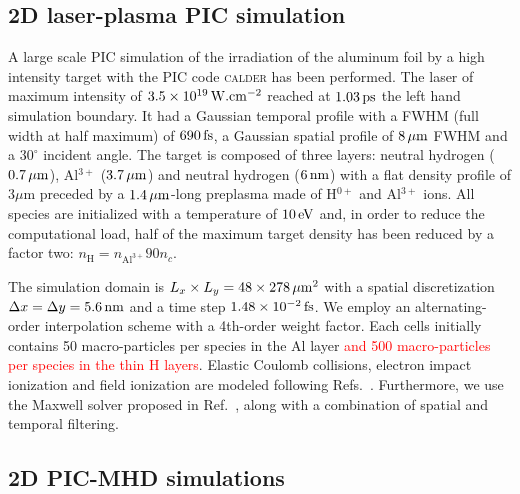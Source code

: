 \documentclass[aps,twocolumn,showpacs,superscriptaddress]{revtex4}
\begin{document}
\subsection*{2D laser-plasma PIC simulation}

A large scale PIC simulation of the irradiation of the aluminum foil by a high intensity target with the PIC code \textsc{calder} has been performed.
The laser of maximum intensity of $3.5 \times 10^{19}\,\rm W.cm^{-2}$ reached at $1.03\,\rm ps$ the left hand simulation boundary. It had a Gaussian temporal profile with a FWHM (full width at half maximum) of $690\,\rm fs$,  a Gaussian spatial profile of $8\,\rm \mu m$ FWHM and a $30^\circ$ incident angle. The target is composed of three layers: neutral hydrogen ($0.7\,\rm \mu m$), Al$^{3+}$ ($3.7\,\rm \mu m$) and neutral hydrogen ($6\,\rm nm$) with a flat density profile of $3 \mu$m preceded by a $1.4\,\rm \mu m$-long preplasma made of H$^{0+}$ and Al$^{3+}$ ions. All species are initialized with a temperature of $10\,\rm eV$ and, in order to reduce the computational load, half of the maximum target density has been reduced by a factor two: $n_\mathrm{H} = n_{\mathrm{Al}^{3+}}90 n_c$.

The simulation domain is $L_x\times L_y = 48 \times 278\,\rm \mu m^2$ with a spatial discretization $\Delta x = \Delta y = 5.6\,\rm nm$ and a time step
$1.48\times 10^{-2}\,\rm fs$. We employ an alternating-order interpolation scheme \cite{CPC_Sokolov_2013} with a 4th-order weight factor. Each cells initially contains
50 macro-particles per species in the Al layer \textcolor{red}{and 500 macro-particles per species in the thin H layers}. Elastic Coulomb collisions, electron impact
ionization and field ionization are modeled following Refs.~\cite{POP_Perez_2012}. Furthermore, we use the Maxwell solver proposed in Ref.~\cite{PRSTAB_Lehe_2013}, along with a combination of spatial \cite{JCP_Vay_2011} and temporal \cite{JCP_Friedman_1990} filtering.

\subsection*{2D PIC-MHD simulations}
\end{document}
